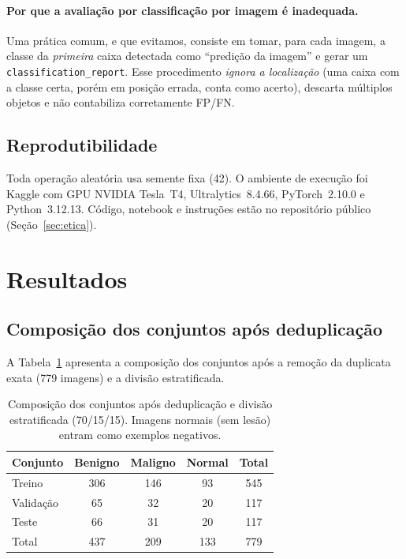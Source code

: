 \documentclass[11pt,a4paper]{article}
\begin{document}
\paragraph{Por que a avaliação por classificação por imagem é inadequada.} Uma
prática comum, e que evitamos, consiste em tomar, para cada imagem, a classe
da \emph{primeira} caixa detectada como ``predição da imagem'' e gerar um
\texttt{classification\_report}. Esse procedimento \emph{ignora a localização}
(uma caixa com a classe certa, porém em posição errada, conta como acerto),
descarta múltiplos objetos e não contabiliza corretamente FP/FN.

\subsection{Reprodutibilidade}
Toda operação aleatória usa semente fixa (42). O ambiente de execução foi
Kaggle com GPU NVIDIA Tesla~T4, Ultralytics~8.4.66, PyTorch~2.10.0 e
Python~3.12.13. Código, notebook e instruções estão no repositório público
(Seção~\ref{sec:etica}).

\section{Resultados}\label{sec:resultados}

\subsection{Composição dos conjuntos após deduplicação}
A Tabela~\ref{tab:splits} apresenta a composição dos conjuntos após a remoção da
duplicata exata (779 imagens) e a divisão estratificada.

\begin{table}[H]
\centering
\caption{Composição dos conjuntos após deduplicação e divisão estratificada
(70/15/15). Imagens normais (sem lesão) entram como exemplos negativos.}
\label{tab:splits}
\begin{tabularx}{0.85\textwidth}{Xcccc}
\toprule
Conjunto & Benigno & Maligno & Normal & Total \\
\midrule
Treino     & 306 & 146 & 93 & 545 \\
Validação  & 65  & 32  & 20 & 117 \\
Teste      & 66  & 31  & 20 & 117 \\
\midrule
Total      & 437 & 209 & 133 & 779 \\
\bottomrule
\end{tabularx}
\end{table}
\end{document}
